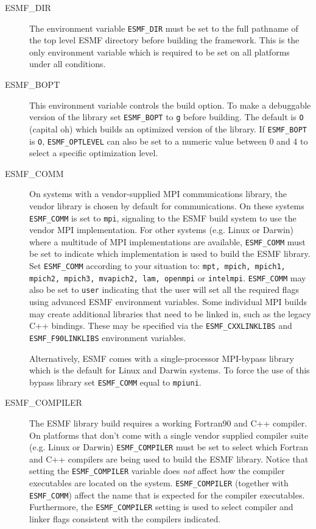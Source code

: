 \begin{description}

\item[ESMF\_DIR]
The environment variable {\tt ESMF\_DIR} must be set to the full pathname 
of the top level ESMF directory before building the framework.  This is the 
only environment variable which is required to be set on all platforms under 
all conditions.

\item[ESMF\_BOPT]
This environment variable controls the build option. To make a debuggable
version of the library set {\tt ESMF\_BOPT} to {\tt g} before building. The
default is {\tt O} (capital oh) which builds an optimized version of the 
library. If {\tt ESMF\_BOPT} is {\tt O}, {\tt ESMF\_OPTLEVEL} can also be set
to a numeric value between 0 and 4 to select a specific optimization level.

\item[ESMF\_COMM]
On systems with a vendor-supplied MPI communications library, the vendor library 
is chosen by default for communications. On these systems {\tt ESMF\_COMM} is
set to {\tt mpi}, signaling to the ESMF build system to use the vendor MPI
implementation.
For other systems (e.g. Linux or Darwin) where a multitude of MPI
implementations are available, {\tt ESMF\_COMM} must be set to indicate which
implementation is used to build the ESMF library. Set {\tt ESMF\_COMM} according
to your situation to: {\tt mpt, mpich, mpich1, mpich2, mpich3, mvapich2, lam, openmpi}
or {\tt intelmpi}. {\tt ESMF\_COMM} may also be set to {\tt user} indicating 
that the user will set all the required flags using advanced ESMF environment
variables.  Some individual MPI builds may create additional libraries that 
need to be linked in, such as the legacy C++ bindings. These may be specified 
via the {\tt ESMF\_CXXLINKLIBS} and {\tt ESMF\_F90LINKLIBS} environment
variables.

Alternatively, ESMF comes with a single-processor MPI-bypass library which is
the default for Linux and Darwin systems. To force the use of this bypass
library set {\tt ESMF\_COMM} equal to {\tt mpiuni}.

\item[ESMF\_COMPILER]
The ESMF library build requires a working Fortran90 and C++ compiler. On 
platforms that don't come with a single vendor supplied compiler suite
(e.g. Linux or Darwin) {\tt ESMF\_COMPILER} must be set to select which Fortran
and C++ compilers are being used to build the ESMF library. Notice that setting
the {\tt ESMF\_COMPILER} variable does {\em not} affect how the compiler
executables are located on the system. {\tt ESMF\_COMPILER} (together with
{\tt ESMF\_COMM}) affect the name that is expected for the compiler executables.
Furthermore, the {\tt ESMF\_COMPILER} setting is used to select compiler and
linker flags consistent with the compilers indicated.


\end{description}

